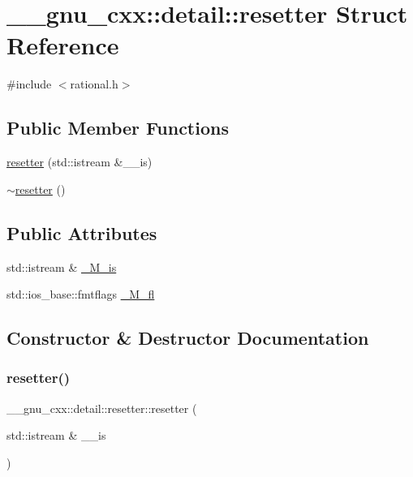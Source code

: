 \hypertarget{struct____gnu__cxx_1_1detail_1_1resetter}{}\section{\+\_\+\+\_\+gnu\+\_\+cxx\+:\+:detail\+:\+:resetter Struct Reference}
\label{struct____gnu__cxx_1_1detail_1_1resetter}


{\ttfamily \#include $<$rational.\+h$>$}

\subsection*{Public Member Functions}
\begin{DoxyCompactItemize}
\item 
\hyperlink{struct____gnu__cxx_1_1detail_1_1resetter_a40fe168cbe000d2955cdb9f0945e1c9e}{resetter} (std\+::istream \&\+\_\+\+\_\+is)
\item 
\hyperlink{struct____gnu__cxx_1_1detail_1_1resetter_a4b95be9fe7e60b8690e9ed288fe36de2}{$\sim$resetter} ()
\end{DoxyCompactItemize}
\subsection*{Public Attributes}
\begin{DoxyCompactItemize}
\item 
std\+::istream \& \hyperlink{struct____gnu__cxx_1_1detail_1_1resetter_a47c399f5d7d59be12c2c89a09a80a5fe}{\+\_\+\+M\+\_\+is}
\item 
std\+::ios\+\_\+base\+::fmtflags \hyperlink{struct____gnu__cxx_1_1detail_1_1resetter_a46d3929f5eda3d9302b63741da101e64}{\+\_\+\+M\+\_\+fl}
\end{DoxyCompactItemize}


\subsection{Constructor \& Destructor Documentation}
\mbox{\label{struct____gnu__cxx_1_1detail_1_1resetter_a40fe168cbe000d2955cdb9f0945e1c9e}} 
\subsubsection{\texorpdfstring{resetter()}{resetter()}}
{\footnotesize\ttfamily \+\_\+\+\_\+gnu\+\_\+cxx\+::detail\+::resetter\+::resetter (\begin{DoxyParamCaption}\item[{std\+::istream \&}]{\+\_\+\+\_\+is }\end{DoxyParamCaption})\hspace{0.3cm}{\ttfamily [inline]}}

